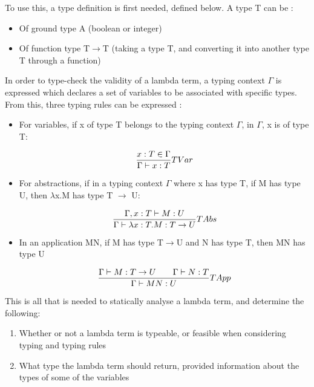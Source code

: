 \documentclass[a4paper,12pt]{report}
\begin{document}
To use this, a type definition is first needed, defined below. A type T can be \cite{Gay2019}:

\begin{itemize}
	\item Of ground type A (boolean or integer)
	\item Of function type T$\rightarrow$T (taking a type T, and converting it into another type T through a function)
\end{itemize}

In order to type-check the validity of a lambda term, a typing context $\Gamma$ is expressed which declares a set of variables to be associated with specific types. From this, three typing rules can be expressed \cite{Gay2019}:

\begin{itemize}
	\item For variables, if x of type T belongs to the typing context $\Gamma$, in $\Gamma$, x is of type T:
	
	\begin{equation}
	\centering
	\frac{x:T\in \Gamma}{\Gamma \vdash x:T}TVar
	\label{variable_type}
	\end{equation}
	\item For abstractions, if in a typing context $\Gamma$ where x has type T, if M has type U, then $\lambda$x.M has type T $\rightarrow$ U:
	
	\begin{equation}
	\centering
	\frac{\Gamma ,x:T\vdash M:U}{\Gamma \vdash \lambda x:T.M:T \to U}TAbs
	\end{equation}
	\item  In an application MN, if M has type T$\rightarrow$U and N has type T, then MN has type U
	
	\begin{equation}
	\centering
	\frac{\Gamma \vdash M:T \to U \qquad \Gamma \vdash N:T}{\Gamma \vdash MN:U}TApp
	\label{application_types}
	\end{equation}
\end{itemize}

This is all that is needed to statically analyse a lambda term, and determine the following:

\begin{enumerate}
	\item Whether or not a lambda term is typeable, or feasible when considering typing and typing rules
	\item What type the lambda term should return, provided information about the types of some of the variables
\end{enumerate}
\end{document}
